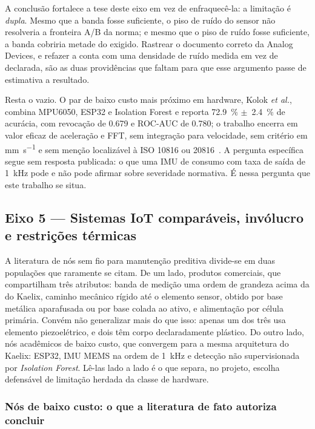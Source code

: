 \documentclass[11pt,a4paper]{article}
\begin{document}
A conclusão fortalece a tese deste eixo em vez de enfraquecê-la: a limitação é
\emph{dupla}. Mesmo que a banda fosse suficiente, o piso de ruído do sensor não resolveria
a fronteira A/B da norma; e mesmo que o piso de ruído fosse suficiente, a banda cobriria
metade do exigido. Rastrear o documento correto da Analog Devices, e refazer a conta com
uma densidade de ruído medida em vez de declarada, são as duas providências que faltam
para que esse argumento passe de estimativa a resultado.

Resta o vazio. O par de baixo custo mais próximo em hardware, Kolok \emph{et al.}, combina
MPU6050, ESP32 e Isolation Forest e reporta \SI{72,9}{\percent} $\pm$~\SI{2,4}{\percent}
de acurácia, com revocação de \num{0,679} e ROC-AUC de \num{0,780}; o trabalho encerra em
valor eficaz de aceleração e FFT, sem integração para velocidade, sem critério em
\si{\milli\meter\per\second} e sem menção localizável à ISO 10816 ou
20816~\cite{kolok2025}. A pergunta específica segue sem resposta publicada: o que uma IMU
de consumo com taxa de saída de \SI{1}{\kilo\hertz} pode e não pode afirmar sobre
severidade normativa. É nessa pergunta que este trabalho se situa.

\subsection{Eixo 5 --- Sistemas IoT comparáveis, invólucro e restrições térmicas}

A literatura de nós sem fio para manutenção preditiva divide-se em duas populações que
raramente se citam. De um lado, produtos comerciais, que compartilham três atributos:
banda de medição uma ordem de grandeza acima da do Kaelix, caminho mecânico rígido até o
elemento sensor, obtido por base metálica aparafusada ou por base colada ao ativo, e
alimentação por célula primária. Convém não generalizar mais do que isso: apenas um dos
três usa elemento piezoelétrico, e dois têm corpo declaradamente plástico. Do outro lado,
nós acadêmicos de baixo custo, que convergem para a mesma arquitetura do Kaelix: ESP32,
IMU MEMS na ordem de \SI{1}{\kilo\hertz} e detecção não supervisionada por \emph{Isolation
Forest}. Lê-las lado a lado é o que separa, no projeto, escolha defensável de limitação
herdada da classe de hardware.

\subsubsection{Nós de baixo custo: o que a literatura de fato autoriza concluir}
\end{document}
